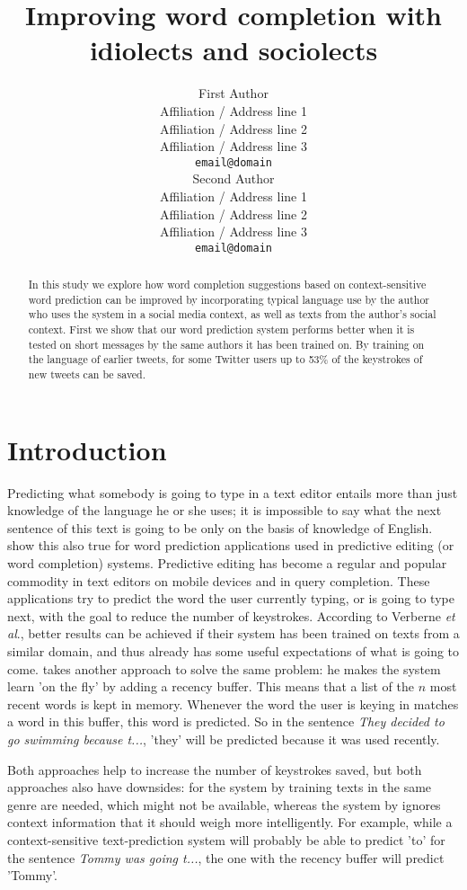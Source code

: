 \documentclass[11pt]{article}
\title{Improving word completion with idiolects and sociolects}
\author{First Author \\
  Affiliation / Address line 1 \\
  Affiliation / Address line 2 \\
  Affiliation / Address line 3 \\
  {\tt email@domain} \\\And
  Second Author \\
  Affiliation / Address line 1 \\
  Affiliation / Address line 2 \\
  Affiliation / Address line 3 \\
  {\tt email@domain} \\}
\date{}
\begin{document}
\maketitle

\begin{abstract} 
In this study we explore how word completion suggestions based on context-sensitive word prediction can be improved by incorporating typical language use by the author who uses the system in a social media context, as well as texts from the author's social context. First we show that our word prediction system performs better when it is tested on short messages by the same authors it has been trained on. By training on the language of earlier tweets, for some Twitter users up to 53\% of the keystrokes of new tweets can be saved. 
\end{abstract}

\section{Introduction}
Predicting what somebody is going to type in a text editor entails more than just knowledge of the language he or she uses; it is impossible to say what the next sentence of this text is going to be only on the basis of knowledge of English.  show this also true for word prediction applications used in predictive editing (or word completion) systems. Predictive editing has become a regular and popular commodity in text editors on mobile devices and in query completion. These applications try to predict the word the user currently typing, or is going to type next, with the goal to reduce the number of keystrokes. According to Verberne {\it et al}., better results can be achieved if their system has been trained on texts from a similar domain, and thus already has some useful expectations of what is going to come.  takes another approach to solve the same problem: he makes the system learn 'on the fly' by adding a recency buffer. This means that a list of the $n$ most recent words is kept in memory. Whenever the word the user is keying in matches a word in this buffer, this word is predicted. So in the sentence \emph{They decided to go swimming because t...}, 'they' will be predicted because it was used recently.

Both approaches help to increase the number of keystrokes saved, but both approaches also have downsides: for the system by  training texts in the same genre are needed, which might not be available, whereas the system by  ignores context information that it should weigh more intelligently. For example, while a context-sensitive text-prediction system will probably be able to predict 'to' for the sentence \emph{Tommy was going t...}, the one with the recency buffer will predict 'Tommy'.
\end{document}
